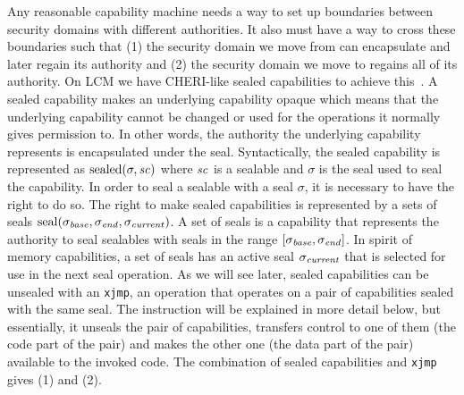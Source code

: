 \documentclass[acmsmall,screen]{acmart}\settopmatter{}
\newcommand{\trgcm}{\textsc{LCM}}
\begin{document}
Any reasonable capability machine needs a way to set up boundaries between security domains with different authorities.
It also must have a way to cross these boundaries such that (1) the security domain we move from can encapsulate and later regain its authority and (2) the security domain we move to regains all of its authority. 
On \trgcm{} we have CHERI-like sealed capabilities to achieve this~\cite{watson_cheri:_2015,watson_fast_2016}.
A sealed capability makes an underlying capability opaque which means that the underlying capability cannot be changed or used for the operations it normally gives permission to.
In other words, the authority the underlying capability represents is encapsulated under the seal.
Syntactically, the sealed capability is represented as $\mathrm{sealed}(\sigma,\mathit{sc})$ where $\mathit{sc}$ is a sealable and $\sigma$ is the seal used to seal the capability.
In order to seal a sealable with a seal $\sigma$, it is necessary to have the right to do so.
The right to make sealed capabilities is represented by a sets of seals $\mathrm{seal}(\sigma_{\mathit{base}},\sigma_{\mathit{end}},\sigma_{\mathit{current}})$.
A set of seals is a capability that represents the authority to seal sealables with seals in the range $[\sigma_{\mathit{base}},\sigma_{\mathit{end}}]$.
In spirit of memory capabilities, a set of seals has an active seal $\sigma_{\mathit{current}}$ that is selected for use in the next seal operation.
As we will see later, sealed capabilities can be unsealed with an \texttt{xjmp}, an operation that operates on a pair of capabilities sealed with the same seal.
The instruction will be explained in more detail below, but essentially, it unseals the pair of capabilities, transfers control to one of them (the code part of the pair) and makes the other one (the data part of the pair) available to the invoked code.
The combination of sealed capabilities and \texttt{xjmp} gives (1) and (2).
\end{document}
